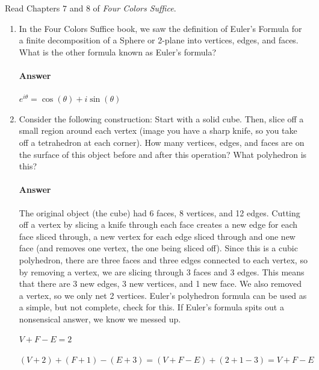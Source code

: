 \documentclass{article}
\begin{document}
 

Read Chapters $7$ and $8$ of \emph{Four Colors Suffice}.

\begin{enumerate}

    \item In the Four Colors Suffice book, we saw the definition of Euler's
        Formula for a finite decomposition of a Sphere or 2-plane into vertices,
        edges, and faces.  What is the other formula known as Euler's formula?

        \paragraph{Answer}
	$e^{i \theta}=\cos(\theta) + i \sin(\theta)$



    \item  Consider the following construction: Start with a solid cube.  Then, slice
        off a small region around each vertex (image you have a sharp knife, so you take
        off a tetrahedron at each corner).  How many vertices, edges, and faces are on
        the surface of this object before and after this operation? What polyhedron is this?

        \paragraph{Answer}
        The original object (the cube) had 6 faces, 8 vertices, and 12 edges. Cutting off a vertex by slicing a knife through each face
        creates a new edge for each face sliced through, a new vertex for each edge sliced through and one new face (and removes one vertex, the one being sliced off). Since this is a cubic polyhedron, there are three faces and three edges connected to each vertex, so by removing a vertex, we are slicing through 3 faces and 3 edges. This means that there are 3 new edges, 3 new vertices, and 1 new face. We also removed a vertex, so we only net 2 vertices. Euler's polyhedron formula can be used as a simple, but not complete, check for this. If Euler's formula spits out a nonsensical answer, we know we messed up.
        
        $V + F-E=2$
        
        $(V+2)+(F+1)-(E+3)=(V+F-E)+(2+1-3)=V+F-E$
        

\end{enumerate}
\end{document}
